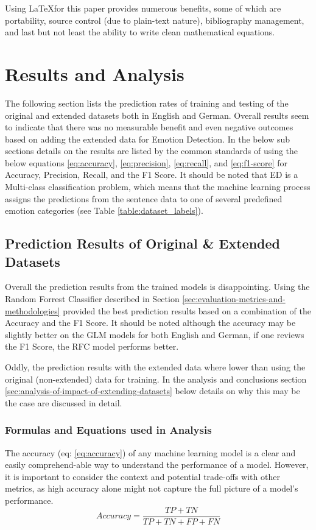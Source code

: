 \documentclass[11pt]{article}
\begin{document}
Using \LaTeX\;for this paper provides numerous benefits, some of which are portability, source control (due to plain-text nature), bibliography management, and last but not least the ability to write clean mathematical equations. 

\clearpage
\section{Results and Analysis}
\label{sec:results-and-analysis}
The following section lists the prediction rates of training and testing of the original and extended datasets both in English and German. Overall results seem to indicate that there was no measurable benefit and even negative outcomes based on adding the extended data for Emotion Detection. In the below sub sections details on the results are listed by the common standards of using the below equations \ref{eq:accuracy}, \ref{eq:precision}, \ref{eq:recall}, and \ref{eq:f1-score} for Accuracy, Precision, Recall, and the F1 Score. It should be noted that ED is a Multi-class classification problem, which means that the machine learning process assigns the predictions from the sentence data to one of several predefined emotion categories (see Table \ref{table:dataset_labels}).

\subsection{Prediction Results of Original \& Extended Datasets}
Overall the prediction results from the trained models is disappointing. Using the Random Forrest Classifier described in Section \ref{sec:evaluation-metrics-and-methodologies} provided the best prediction results based on a combination of the Accuracy and the F1 Score. It should be noted although the accuracy may be slightly better on the GLM models for both English and German, if one reviews the F1 Score, the RFC model performs better.

Oddly, the prediction results with the extended data where lower than using the original (non-extended) data for training. In the analysis and conclusions section \ref{sec:analysis-of-impact-of-extending-datasets} below details on why this may be the case are discussed in detail.

\subsubsection{Formulas and Equations used in Analysis}
The accuracy (eq: \ref{eq:accuracy}) of any machine learning model is a clear and easily comprehend-able way to understand the performance of a model. However, it is important to consider the context and potential trade-offs with other metrics, as high accuracy alone might not capture the full picture of a model's performance.
\begin{equation}
Accuracy = \frac{TP+TN}{TP+TN+FP+FN}
\label{eq:accuracy}
\end{equation}
\end{document}
